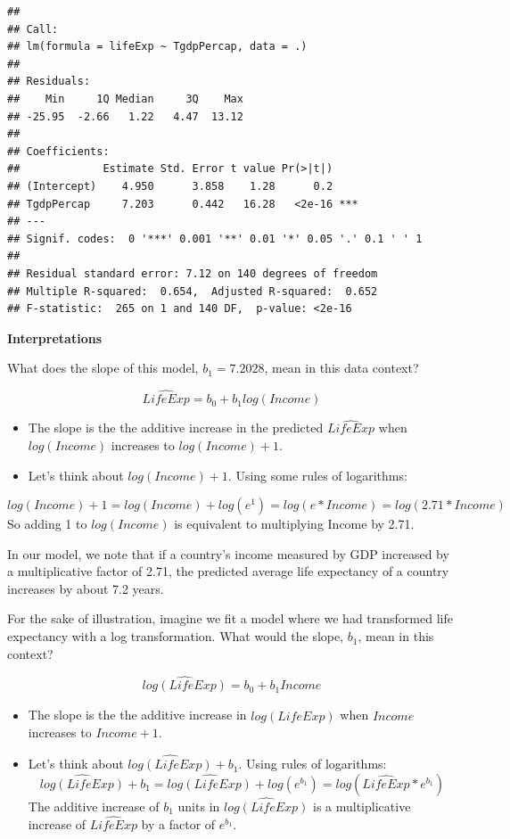 \documentclass[]{book}
\begin{document}
\begin{verbatim}
## 
## Call:
## lm(formula = lifeExp ~ TgdpPercap, data = .)
## 
## Residuals:
##    Min     1Q Median     3Q    Max 
## -25.95  -2.66   1.22   4.47  13.12 
## 
## Coefficients:
##             Estimate Std. Error t value Pr(>|t|)    
## (Intercept)    4.950      3.858    1.28      0.2    
## TgdpPercap     7.203      0.442   16.28   <2e-16 ***
## ---
## Signif. codes:  0 '***' 0.001 '**' 0.01 '*' 0.05 '.' 0.1 ' ' 1
## 
## Residual standard error: 7.12 on 140 degrees of freedom
## Multiple R-squared:  0.654,  Adjusted R-squared:  0.652 
## F-statistic:  265 on 1 and 140 DF,  p-value: <2e-16
\end{verbatim}

\textbf{Interpretations}

What does the slope of this model, \(b_1 = 7.2028\), mean in this data context?

\[\widehat{LifeExp} = b_0 + b_1 log(Income)\]

\begin{itemize}
\item
  The slope is the the additive increase in the predicted \(\widehat{LifeExp}\) when \(log(Income)\) increases to \(log(Income) + 1\).
\item
  Let's think about \(log(Income) + 1\). Using some rules of logarithms:
\end{itemize}

\[log(Income) + 1 = log(Income) + log(e^1) = log(e*Income) = log(2.71*Income)\]
So adding 1 to \(log(Income)\) is equivalent to multiplying Income by 2.71.

In our model, we note that if a country's income measured by GDP increased by a multiplicative factor of 2.71, the predicted average life expectancy of a country increases by about 7.2 years.

For the sake of illustration, imagine we fit a model where we had transformed life expectancy with a log transformation. What would the slope, \(b_1\), mean in this context?

\[\widehat{log(LifeExp)} = b_0 + b_1 Income\]

\begin{itemize}
\item
  The slope is the the additive increase in \(\widehat{log(LifeExp)}\) when \(Income\) increases to \(Income + 1\).
\item
  Let's think about \(\widehat{log(LifeExp)} + b_1\). Using rules of logarithms:
  \[\widehat{log(LifeExp)} + b_1 = \widehat{log(LifeExp)} + log(e^{b_1}) = log(\widehat{LifeExp} * e^{b_1}) \]
  The additive increase of \(b_1\) units in \(\widehat{log(LifeExp)}\) is a multiplicative increase of \(\widehat{LifeExp}\) by a factor of \(e^{b_1}\).
\end{itemize}
\end{document}
